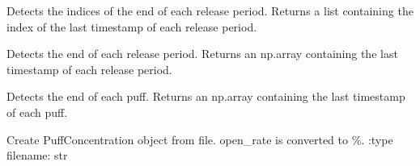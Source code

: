 \documentclass[letterpaper,10pt,english]{sphinxmanual}
\begin{document}
\begin{fulllineitems}
\begin{fulllineitems}
\end{fulllineitems}


\begin{fulllineitems}
\label{\detokenize{index:windtunnel.PuffConcentration.detect_end_release_index}}
Detects the indices of the end of each release period. Returns a
list containing the index of the last timestamp of each release 
period.

\end{fulllineitems}


\begin{fulllineitems}
\label{\detokenize{index:windtunnel.PuffConcentration.detect_end_release_period}}
Detects the end of each release period. Returns an np.array 
containing the last timestamp of each release period.

\end{fulllineitems}


\begin{fulllineitems}
\label{\detokenize{index:windtunnel.PuffConcentration.detect_leaving_time}}
Detects the end of each puff. Returns an np.array 
containing the last timestamp of each puff.

\end{fulllineitems}


\begin{fulllineitems}
\label{\detokenize{index:windtunnel.PuffConcentration.from_file}}
Create PuffConcentration object from file. open\_rate is converted
to \%.
:type filename: str

\end{fulllineitems}



\end{fulllineitems}
\end{document}
